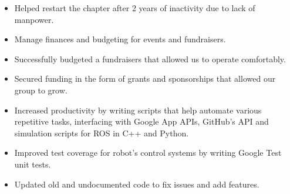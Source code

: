 




\begin{itemize}
  \item Helped restart the chapter after 2 years of inactivity due to lack of manpower.
  \item Manage finances and budgeting for events and fundraisers.
  \item Successfully budgeted a fundraisers that allowed us to operate comfortably.
  \item Secured funding in the form of grants and sponsorships that allowed our group to grow.
\end{itemize}
\divider\small

\begin{itemize}
  \item Increased productivity by writing scripts that help automate various repetitive tasks, interfacing with Google App APIs, GitHub’s API and simulation scripts for ROS in C++ and Python.
  \item Improved test coverage for robot’s control systems by writing Google Test unit tests.
  \item Updated old and undocumented code to fix issues and add features.
\end{itemize}
\divider\small
